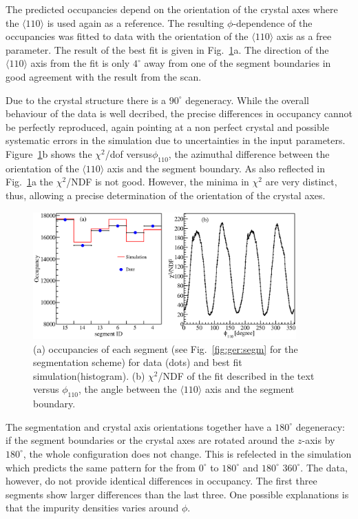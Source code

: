 The predicted occupancies depend on the orientation of the crystal axes where the $\langle 110 \rangle$ is used again as a reference. The resulting $\phi$-dependence of the occupancies was fitted to data with the orientation of the  $\langle 110 \rangle$ axis as a free parameter. The result of the best fit is given in Fig.~\ref{fig:psa:focc}a. The direction of the $\langle 110 \rangle$ axis from the fit is only $4^\circ$ away from one of the segment boundaries in good agreement with the result from the scan.

Due to the crystal structure there is a $90^{\circ}$ degeneracy. While the overall behaviour of the data is well decribed, the precise differences in occupancy cannot be perfectly reproduced, again pointing at a non perfect crystal and possible systematic errors in the simulation due to uncertainties in the input parameters. Figure~\ref{fig:psa:focc}b shows the $\chi^2$/dof versus$\phi_{110}$, the azimuthal difference between the orientation of the $\langle 110 \rangle$ axis and the segment boundary. As also reflected in Fig.~\ref{fig:psa:focc}a the $\chi^2$/NDF is not good. However, the minima in $\chi^2$ are very distinct,
thus, allowing a precise determination of the orientation of the crystal axes.

\begin{figure}[htbp]
\centering
\includegraphics[width=0.9\textwidth]{fitocc}
\caption{(a) occupancies of each segment (see Fig.~\ref{fig:ger:segm} for the segmentation scheme) for data (dots) and best fit simulation(histogram). (b) $\chi^{2}$/NDF of the fit described in the text versus $\phi_{110}$, the angle between the $\langle 110 \rangle$ axis and the segment boundary.}
\label{fig:psa:focc}
\end{figure}

The segmentation and crystal axis orientations together have a $180^{\circ}$ degeneracy: if the segment boundaries or the crystal axes are rotated around the $z$-axis by $180^{\circ}$, the whole configuration does not change. This is refelected in the simulation which predicts the same pattern for the from $0^{\circ}$ to $180^{\circ}$ and $180^{\circ}$ $360^{\circ}$. The data, however, do not provide identical differences in occupancy. The first three segments show larger differences than the last three. One possible explanations is that the impurity densities varies around $\phi$.


